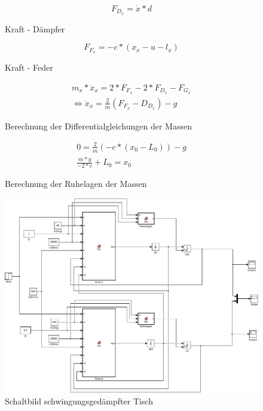 \documentclass[10pt,a4paper]{article}
\begin{document}
\begin{figure}[H]
\begin{equation}
	F_{D_x} = \dot{x} * d
\end{equation}
\caption{Kraft - Dämpfer}
\end{figure}

\begin{figure}[H]
\begin{equation}
	F_{F_x} = -c * (x_x - u - l_x)
\end{equation}
\caption{Kraft - Feder}
\end{figure}

\begin{figure}[H]
\begin{subequations}
\begin{align}
	m_x * \ddot{x}_x = 2 * F_{F_x} - 2 * F_{D_x} - F_{G_x} \\
	\iff \ddot{x}_x = \frac{2}{m} (F_{F_x} - D_{D_x}) - g
\end{align}
\end{subequations}
\caption{Berechnung der Differentialgleichungen der Massen}
\end{figure}

\begin{figure}[H]
\begin{subequations}
\begin{align}
	0 = \frac{2}{m} (-c * (x_0 - L_0)) - g \\
	\frac{m * g}{-2 * c} + L_0 = x_0
\end{align}
\end{subequations}
\caption{Berechnung der Ruhelagen der Massen}
\end{figure}

\begin{figure}[H]
	\centering
	\includegraphics[width=1\textwidth]{../aufgabe3/screens/tisch}
	\caption{Schaltbild schwingungsgedämpfter Tisch}
  \end{figure}
\end{document}
